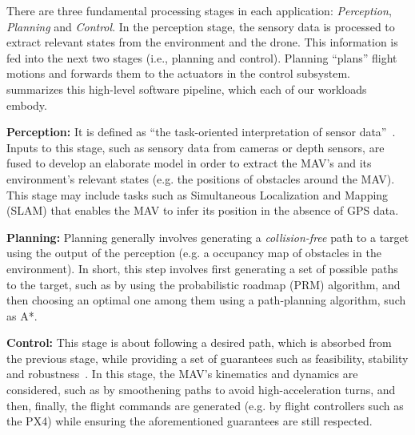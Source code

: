 There are three fundamental processing stages in each application: \emph{Perception}, \emph{Planning} and \emph{Control}. In the perception stage, the sensory data is processed to extract relevant states from the environment and the drone. This information is fed into the next two stages (i.e., planning and control). Planning ``plans'' flight motions and forwards them to the actuators in the control subsystem.  summarizes this high-level software pipeline, which each of our workloads embody.

\textbf{Perception:}
It is defined as ``the task-oriented interpretation of sensor data''~\cite{Handbook_robotic}. Inputs to this stage, such as sensory data from cameras or depth sensors, are fused to develop an elaborate model in order to extract the MAV's and its environment's relevant states (e.g. the positions of obstacles around the MAV). This stage may include tasks such as Simultaneous Localization and Mapping (SLAM) that enables the MAV to infer its position in the absence of GPS data.

\textbf{Planning:}
 Planning generally involves generating a \textit{collision-free} path to a target using the output of the perception (e.g. a occupancy map of obstacles in the environment). In short, this step involves first generating a set of possible paths to the target, such as by using the probabilistic roadmap (PRM) algorithm, and then choosing an optimal one among them using a path-planning algorithm, such as A*.

\textbf{Control:}
This stage is about following a desired path, which is absorbed from the previous stage, while providing a set of guarantees such as feasibility, stability and robustness~\cite{tech_problem}. In this stage, the MAV's kinematics and  dynamics are considered, such as by smoothening paths to avoid high-acceleration turns, and then, finally, the flight commands are generated (e.g. by flight controllers such as the PX4) while ensuring the aforementioned guarantees are still respected.

